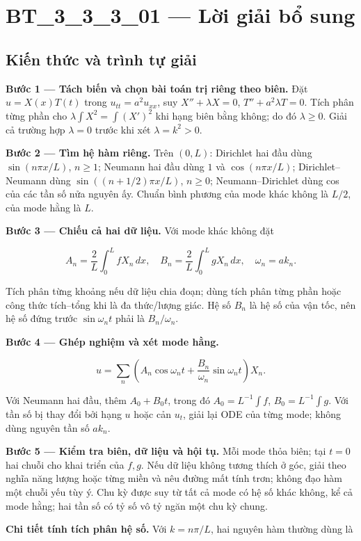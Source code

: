 \documentclass[10pt,a4paper]{article}
\begin{document}
\section*{BT\_3\_3\_3\_01 — Lời giải bổ sung}
\subsection*{Kiến thức và trình tự giải}
\textbf{Bước 1 — Tách biến và chọn bài toán trị riêng theo biên.} Đặt $u=X(x)T(t)$ trong $u_{tt}=a^2u_{xx}$, suy $X''+\lambda X=0$, $T''+a^2\lambda T=0$. Tích phân từng phần cho $\lambda\int X^2=\int (X')^2$ khi hạng biên bằng không; do đó $\lambda\ge0$. Giải cả trường hợp $\lambda=0$ trước khi xét $\lambda=k^2>0$.

\textbf{Bước 2 — Tìm hệ hàm riêng.} Trên $(0,L)$: Dirichlet hai đầu dùng $\sin(n\pi x/L)$, $n\ge1$; Neumann hai đầu dùng $1$ và $\cos(n\pi x/L)$; Dirichlet–Neumann dùng $\sin((n+1/2)\pi x/L)$, $n\ge0$; Neumann–Dirichlet dùng cos của các tần số nửa nguyên ấy. Chuẩn bình phương của mode khác không là $L/2$, của mode hằng là $L$.

\textbf{Bước 3 — Chiếu cả hai dữ liệu.} Với mode khác không đặt


\[
A_n=\frac2L\int_0^L fX_n\,dx,\quad B_n=\frac2L\int_0^L gX_n\,dx,\quad \omega_n=ak_n.
\]


Tích phân từng khoảng nếu dữ liệu chia đoạn; dùng tích phân từng phần hoặc công thức tích–tổng khi là đa thức/lượng giác. Hệ số $B_n$ là hệ số của vận tốc, nên hệ số đứng trước $\sin\omega_nt$ phải là $B_n/\omega_n$.

\textbf{Bước 4 — Ghép nghiệm và xét mode hằng.}


\[
u=\sum_n\left(A_n\cos\omega_nt+\frac{B_n}{\omega_n}\sin\omega_nt\right)X_n.
\]


Với Neumann hai đầu, thêm $A_0+B_0t$, trong đó $A_0=L^{-1}\int f$, $B_0=L^{-1}\int g$. Với tần số bị thay đổi bởi hạng $u$ hoặc cản $u_t$, giải lại ODE của từng mode; không dùng nguyên tần số $ak_n$.

\textbf{Bước 5 — Kiểm tra biên, dữ liệu và hội tụ.} Mỗi mode thỏa biên; tại $t=0$ hai chuỗi cho khai triển của $f,g$. Nếu dữ liệu không tương thích ở góc, giải theo nghĩa năng lượng hoặc từng miền và nêu đường mất tính trơn; không đạo hàm một chuỗi yếu tùy ý. Chu kỳ được suy từ tất cả mode có hệ số khác không, kể cả mode hằng; hai tần số có tỷ số vô tỷ ngăn một chu kỳ chung.

\textbf{Chi tiết tính tích phân hệ số.} Với $k=n\pi/L$, hai nguyên hàm thường dùng là
\end{document}
